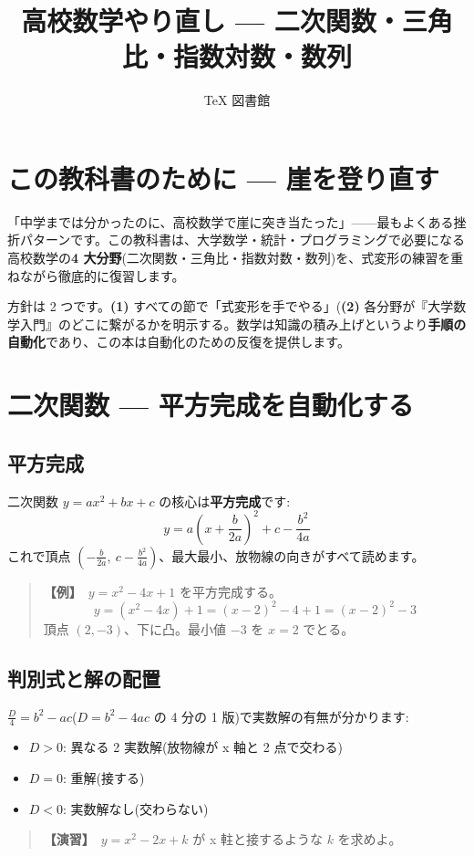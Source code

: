 \documentclass{article}
\title{高校数学やり直し — 二次関数・三角比・指数対数・数列}
\author{TeX 図書館}
\begin{document}
\section{この教科書のために — 崖を登り直す}

「中学までは分かったのに、高校数学で崖に突き当たった」——最もよくある挫折パターンです。この教科書は、大学数学・統計・プログラミングで必要になる高校数学の\textbf{4 大分野}(二次関数・三角比・指数対数・数列)を、式変形の練習を重ねながら徹底的に復習します。

方針は 2 つです。\textbf{(1)} すべての節で「式変形を手でやる」(\textbf{(2)} 各分野が『大学数学入門』のどこに繋がるかを明示する。数学は知識の積み上げというより\textbf{手順の自動化}であり、この本は自動化のための反復を提供します。

\section{二次関数 — 平方完成を自動化する}

\subsection{平方完成}

二次関数 \(y = ax^2 + bx + c\) の核心は\textbf{平方完成}です:
\[ y = a\left(x + \frac{b}{2a}\right)^2 + c - \frac{b^2}{4a} \]
これで頂点 \(\left(-\frac{b}{2a},\ c - \frac{b^2}{4a}\right)\)、最大最小、放物線の向きがすべて読めます。

\begin{quote}
\textbf{【例】}\ \(y = x^2 - 4x + 1\) を平方完成する。
\[ y = (x^2 - 4x) + 1 = (x-2)^2 - 4 + 1 = (x-2)^2 - 3 \]
頂点 \((2, -3)\)、下に凸。最小値 \(-3\) を \(x = 2\) でとる。
\end{quote}

\subsection{判別式と解の配置}

\(\frac{D}{4} = b^2 - ac\)(\(D = b^2 - 4ac\) の 4 分の 1 版)で実数解の有無が分かります:
\begin{itemize}
\item \(D > 0\): 異なる 2 実数解(放物線が x 軸と 2 点で交わる)
\item \(D = 0\): 重解(接する)
\item \(D < 0\): 実数解なし(交わらない)
\end{itemize}

\begin{quote}
\textbf{【演習】}\ \(y = x^2 - 2x + k\) が x 軴と接するような \(k\) を求めよ。
\end{quote}
\end{document}
